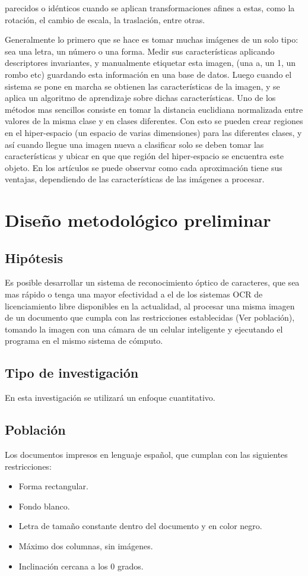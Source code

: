 \documentclass[a4paper, 11pt, oneside]{article}
\begin{document}
	parecidos o idénticos cuando se aplican	transformaciones afines a estas, como la rotación,
	el cambio de escala, la traslación, entre otras. \newline	
	
	Generalmente lo primero que se hace es tomar muchas imágenes de un solo tipo: sea una letra, un 
	número o una forma. Medir sus características aplicando descriptores invariantes, y manualmente 
    etiquetar esta imagen, (una a, un 1, un rombo etc) guardando esta información en una base de
    datos. Luego cuando el sistema se pone en marcha se obtienen las características de la imagen,
    y se aplica un algoritmo de aprendizaje sobre dichas características. Uno de los métodos mas
	sencillos consiste en tomar la distancia euclidiana normalizada entre valores de la misma
	clase y en clases diferentes. Con esto se pueden crear regiones en el hiper-espacio (un
	espacio de varias dimensiones) para las diferentes clases, y así cuando llegue una imagen
	nueva a clasificar solo se deben tomar las características y ubicar en que que región del
	hiper-espacio se encuentra este objeto. En los artículos se puede observar como  
	cada aproximación tiene sus ventajas, dependiendo de las características de las imágenes a
	procesar.
	\newpage
		
	\section{Diseño metodológico preliminar}
	
	\subsection{Hipótesis}
	Es posible desarrollar un sistema de reconocimiento óptico de caracteres, que sea mas rápido o
	tenga una mayor efectividad a el de los sistemas OCR de licenciamiento libre disponibles
	en la actualidad, al procesar una misma imagen de un documento que cumpla con las restricciones
	establecidas (Ver población), tomando la imagen con una cámara de un celular inteligente y
	ejecutando el programa en el mismo sistema de cómputo.	
	
	\subsection{Tipo de investigación}
	En esta investigación se utilizará un enfoque cuantitativo.
	
	\subsection{Población}
	Los documentos impresos en lenguaje español, que cumplan con las siguientes restricciones:
	\begin{itemize}
	\item Forma rectangular.
	\item Fondo blanco.
	\item Letra de tamaño constante dentro del documento y en color negro.
	\item Máximo dos columnas, sin imágenes.
	\item Inclinación cercana a los 0 grados.
	\end{itemize}
	
\end{document}
